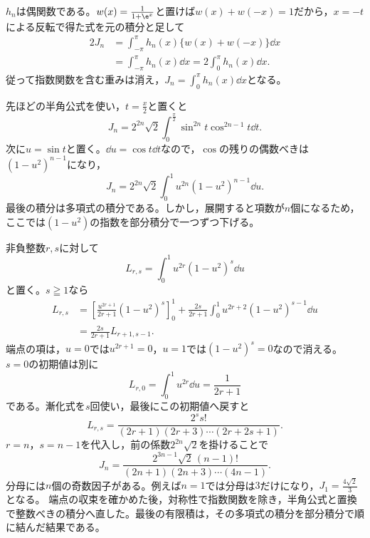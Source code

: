 $h_n$は偶関数である。$w(x)=\frac1{1+\e^x}$と置けば$w(x)+w(-x)=1$だから，$x=-t$による反転で得た式を元の積分と足して
\[
 \begin{aligned}
 2J_n
 &=\int_{-\pi}^{\pi}h_n(x)\{w(x)+w(-x)\}\dd x\\
 &=\int_{-\pi}^{\pi}h_n(x)\dd x
 =2\int_0^\pi h_n(x)\dd x.
 \end{aligned}
\]
従って指数関数を含む重みは消え，$J_n=\int_0^\pi h_n(x)\dd x$となる。

先ほどの半角公式を使い，$t=\frac x2$と置くと
\[
 J_n=2^{2n}\sqrt2\int_0^{\frac\pi2}
          \sin^{2n}t\cos^{2n-1}t\dd t.
\]
次に$u=\sin t$と置く。$\dd u=\cos t\dd t$なので，$\cos$の残りの偶数べきは$(1-u^2)^{n-1}$になり，
\[
 J_n=2^{2n}\sqrt2\int_0^1u^{2n}(1-u^2)^{n-1}\dd u.
\]
最後の積分は多項式の積分である。しかし，展開すると項数が$n$個になるため，ここでは$(1-u^2)$の指数を部分積分で一つずつ下げる。

非負整数$r,s$に対して
\[
 L_{r,s}=\int_0^1u^{2r}(1-u^2)^s\dd u
\]
と置く。$s\geqq1$なら
\[
 \begin{aligned}
 L_{r,s}
 &=\left[\frac{u^{2r+1}}{2r+1}(1-u^2)^s\right]_0^1
   +\frac{2s}{2r+1}\int_0^1u^{2r+2}(1-u^2)^{s-1}\dd u\\
 &=\frac{2s}{2r+1}L_{r+1,s-1}.
 \end{aligned}
\]
端点の項は，$u=0$では$u^{2r+1}=0$，$u=1$では$(1-u^2)^s=0$なので消える。$s=0$の初期値は別に
\[
 L_{r,0}=\int_0^1u^{2r}\dd u=\frac1{2r+1}
\]
である。漸化式を$s$回使い，最後にこの初期値へ戻すと
\[
 L_{r,s}
 =\frac{2^s s!}{(2r+1)(2r+3)\cdots(2r+2s+1)}.
\]
$r=n$，$s=n-1$を代入し，前の係数$2^{2n}\sqrt2$を掛けることで
\[
 \boxed{J_n=
 \frac{2^{3n-1}\sqrt2\,(n-1)!}
 {(2n+1)(2n+3)\cdots(4n-1)}}.
\]
分母には$n$個の奇数因子がある。例えば$n=1$では分母は$3$だけになり，$J_1=\frac{4\sqrt2}{3}$となる。
端点の収束を確かめた後，対称性で指数関数を除き，半角公式と置換で整数べきの積分へ直した。最後の有限積は，その多項式の積分を部分積分で順に結んだ結果である。
